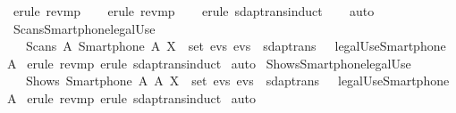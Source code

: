 \begin{isabellebody}
  \isamarkupfalse%
  \ {\isacharparenleft}erule\ rev{\isacharunderscore}mp{\isacharparenright}\isanewline
  \ \ \isamarkupfalse%
  \ {\isacharparenleft}erule\ rev{\isacharunderscore}mp{\isacharparenright}\isanewline
  \ \ \isamarkupfalse%
  \ {\isacharparenleft}erule\ sdaptrans{\isachardot}induct{\isacharparenright}\isanewline
  \ \ \isamarkupfalse%
  \ {\isacharparenleft}auto{\isacharparenright}\isanewline
  \isamarkupfalse%
  \endisatagproof
  {\isafoldproof}%
  \isadelimproof
  \endisadelimproof
  \isadelimdocument
  \endisadelimdocument
  \isatagdocument
  \isamarkuptrue%
  \endisatagdocument
  {\isafolddocument}%
  \isadelimdocument
  \endisadelimdocument
  \isamarkupfalse%
  \ Scans{\isacharunderscore}Smartphone{\isacharunderscore}legalUse\ {\isacharcolon}\isanewline
  \ \ {\isachardoublequoteopen}{\isasymlbrakk}\ Scans\ A\ {\isacharparenleft}Smartphone\ A{\isacharparenright}\ X\ {\isasymin}\ set\ evs{\isacharsemicolon}\ evs\ {\isasymin}\ sdaptrans\ {\isasymrbrakk}\ {\isasymLongrightarrow}\ legalUse{\isacharparenleft}Smartphone\ A{\isacharparenright}{\isachardoublequoteclose}\isanewline
  \isadelimproof
  \endisadelimproof
  \isatagproof
  \isamarkupfalse%
  \ {\isacharparenleft}erule\ rev{\isacharunderscore}mp{\isacharcomma}\ erule\ sdaptrans{\isachardot}induct{\isacharparenright}\isanewline
  \isamarkupfalse%
  \ {\isacharparenleft}auto{\isacharparenright}\isanewline
  \isamarkupfalse%
  \endisatagproof
  {\isafoldproof}%
  \isadelimproof
  \isanewline
  \endisadelimproof
  \isanewline
  \isamarkupfalse%
  \ Shows{\isacharunderscore}Smartphone{\isacharunderscore}legalUse\ {\isacharcolon}\isanewline
  \ \ {\isachardoublequoteopen}{\isasymlbrakk}\ Shows\ {\isacharparenleft}Smartphone\ A{\isacharparenright}\ A\ X\ {\isasymin}\ set\ evs{\isacharsemicolon}\ evs\ {\isasymin}\ sdaptrans\ {\isasymrbrakk}\ {\isasymLongrightarrow}\ legalUse{\isacharparenleft}Smartphone\ A{\isacharparenright}{\isachardoublequoteclose}\isanewline
  \isadelimproof
  \endisadelimproof
  \isatagproof
  \isamarkupfalse%
  \ {\isacharparenleft}erule\ rev{\isacharunderscore}mp{\isacharcomma}\ erule\ sdaptrans{\isachardot}induct{\isacharparenright}\isanewline
  \isamarkupfalse%
  \ {\isacharparenleft}auto{\isacharparenright}\isanewline
  \isamarkupfalse%

\end{isabellebody}
